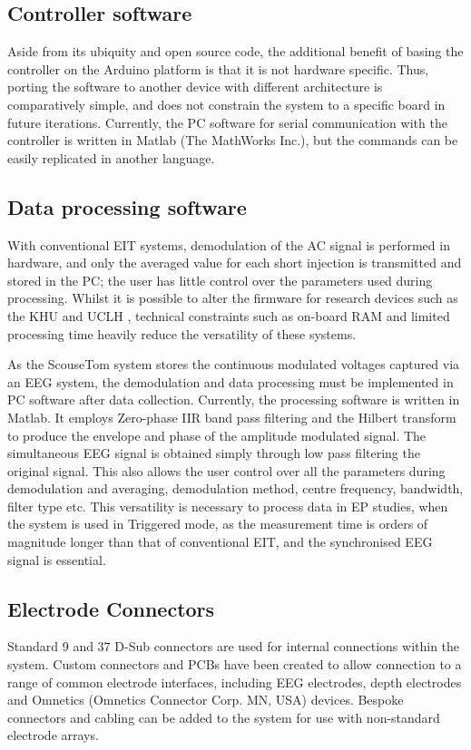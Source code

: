 
\subsection{Controller software}

Aside from its ubiquity and open source code, the additional benefit of basing the controller on the Arduino platform is that it is not hardware specific. Thus, porting the software to another device with different architecture is comparatively simple, and does not constrain the system to a specific board in future iterations. Currently, the PC software for serial communication with the controller is written in Matlab (The MathWorks Inc.), but the commands can be easily replicated in another language.

\subsection{Data processing software}

With conventional EIT systems, demodulation of the AC signal is performed in hardware, and only the averaged value for each short injection is transmitted and stored in the PC; the user has little control over the parameters used during processing. Whilst it is possible to alter the firmware for research devices such as the KHU \cite{Hun_Wi_2014} and UCLH \cite{McEwan_2006}, technical constraints such as on-board RAM and limited processing time heavily reduce the versatility of these systems. 

As the ScouseTom system stores the continuous modulated voltages captured via an EEG system, the demodulation and data processing must be implemented in PC software after data collection. Currently, the processing software is written in Matlab. It employs Zero-phase IIR band pass filtering and the Hilbert transform to produce the envelope and phase of the amplitude modulated signal. The simultaneous EEG signal is obtained simply through low pass filtering the original signal. This also allows the user control over all the parameters during demodulation and averaging, demodulation method, centre frequency, bandwidth, filter type etc. This versatility is necessary to process data in EP studies, when the system is used in Triggered mode, as the measurement time is orders of magnitude longer than that of conventional EIT, and the synchronised EEG signal is essential. 

\subsection{Electrode Connectors}

Standard 9 and 37 D-Sub connectors are used for internal connections within the system. Custom connectors and PCBs have been created to allow connection to a range of common electrode interfaces, including EEG electrodes, depth electrodes and Omnetics (Omnetics Connector Corp. MN, USA) devices. Bespoke connectors and cabling can be added to the system for use with non-standard electrode arrays.